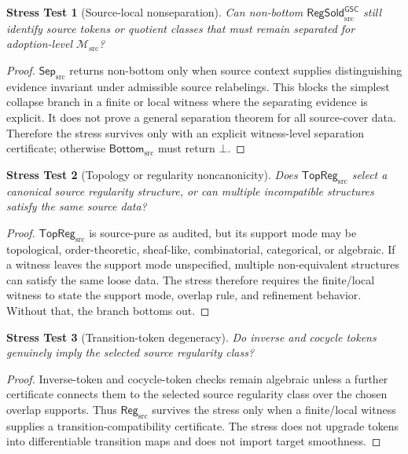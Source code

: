 \documentclass[11pt]{article}
\newcommand{\Msrc}{\mathcal{M}_{\mathrm{src}}}
\newcommand{\RegSold}{\mathsf{RegSold}_{\mathrm{src}}^{\mathsf{GSC}}}
\newcommand{\SepSrc}{\mathsf{Sep}_{\mathrm{src}}}
\newcommand{\TopRegSrc}{\mathsf{TopReg}_{\mathrm{src}}}
\newcommand{\RegSrc}{\mathsf{Reg}_{\mathrm{src}}}
\newcommand{\BottomSrc}{\mathsf{Bottom}_{\mathrm{src}}}
\newcommand{\Bot}{\bot}
\newtheorem{stress}{Stress Test}
\begin{document}
\begin{stress}[Source-local nonseparation]
Can non-bottom \(\RegSold\) still identify source tokens or quotient classes
that must remain separated for adoption-level \(\Msrc\)?
\end{stress}

\begin{proof}
\(\SepSrc\) returns non-bottom only when source context supplies
distinguishing evidence invariant under admissible source relabelings. This
blocks the simplest collapse branch in a finite or local witness where the
separating evidence is explicit. It does not prove a general separation
theorem for all source-cover data. Therefore the stress survives only with an
explicit witness-level separation certificate; otherwise \(\BottomSrc\) must
return \(\Bot\).
\end{proof}

\begin{stress}[Topology or regularity noncanonicity]
Does \(\TopRegSrc\) select a canonical source regularity structure, or can
multiple incompatible structures satisfy the same source data?
\end{stress}

\begin{proof}
\(\TopRegSrc\) is source-pure as audited, but its support mode may be
topological, order-theoretic, sheaf-like, combinatorial, categorical, or
algebraic. If a witness leaves the support mode unspecified, multiple
non-equivalent structures can satisfy the same loose data. The stress
therefore requires the finite/local witness to state the support mode,
overlap rule, and refinement behavior. Without that, the branch bottoms out.
\end{proof}

\begin{stress}[Transition-token degeneracy]
Do inverse and cocycle tokens genuinely imply the selected source regularity
class?
\end{stress}

\begin{proof}
Inverse-token and cocycle-token checks remain algebraic unless a further
certificate connects them to the selected source regularity class over the
chosen overlap supports. Thus \(\RegSrc\) survives the stress only when a
finite/local witness supplies a transition-compatibility certificate. The
stress does not upgrade tokens into differentiable transition maps and does
not import target smoothness.
\end{proof}
\end{document}

